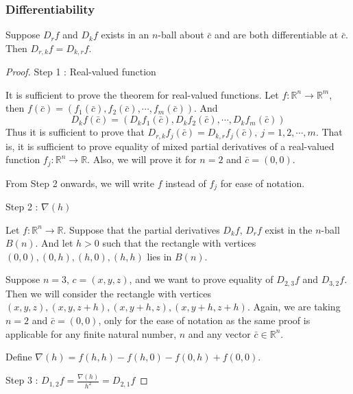 \subsubsection{Differentiability}
\begin{theorem}
Suppose $D_r f$ and $D_k f$ exists in an $n$-ball about $\bar{c}$ and are both differentiable at $\bar{c}$.
Then $D_{r,k} f = D_{k,r} f$.
\end{theorem}
\begin{proof}
Step 1 : Real-valued function

It is sufficient to prove the theorem for real-valued functions.
Let $f : \mathbb{R}^n \to \mathbb{R}^m$, then $f(\bar{c}) = \left( f_1(\bar{c}),f_2(\bar{c}),\cdots,f_m(\bar{c}) \right)$.
And $$D_k f(\bar{c}) = \left( D_k f_1(\bar{c}), D_k f_2(\bar{c}), \cdots, D_k f_m(\bar{c}) \right)$$
Thus it is sufficient to prove that $D_{r,k}f_j(\bar{c}) = D_{k,r}f_j(\bar{c}),\ j = 1,2,\cdots,m$.
That is, it is sufficient to prove equality of mixed partial derivatives of a real-valued function $f_j : \mathbb{R}^n \to \mathbb{R}$.
Also, we will prove it for $n = 2$ and $\bar{c} = (0,0)$.
\begin{commentary}
From Step 2 onwards, we will write $f$ instead of $f_j$ for ease of notation.
\end{commentary}

Step 2 : $\nabla(h)$

Let $f : \mathbb{R}^n \to \mathbb{R}$.
Suppose that the partial derivatives $D_k f$, $D_r f$ exist in the $n$-ball $B(n)$.
And let $h > 0$ such that the rectangle with vertices $(0,0), (0,h), (h,0), (h,h)$ lies in $B(n)$.
\begin{commentary} Suppose $n=3$, $c = (x,y,z)$, and we want to prove equality of $D_{2,3} f$ and $D_{3,2} f$.
Then we will consider the rectangle with vertices $(x,y,z), (x,y,z+h), (x,y+h,z), (x,y+h,z+h)$.
Again, we are taking $n=2$ and $\bar{c} = (0,0)$, only for the ease of notation as the same proof is applicable for any finite natural number, $n$ and any vector $\bar{c} \in \mathbb{R}^n$.\end{commentary}

Define $\nabla(h) = f(h,h)-f(h,0)-f(0,h)+f(0,0)$.

Step 3 : $D_{1,2} f = \frac{\nabla(h)}{h^2} = D_{2,1} f$


\end{proof}
